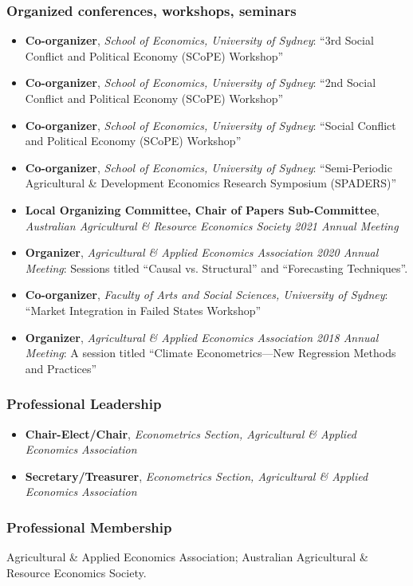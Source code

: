 \documentclass[10pt]{article}
\begin{document}
	\subsubsection*{Organized conferences, workshops, seminars}
	\begin{itemize}
		\item {} \textbf{Co-organizer}, \textsl{School of Economics, University of Sydney}: ``3rd Social Conflict and Political Economy (SCoPE) Workshop''
		\item {} \textbf{Co-organizer}, \textsl{School of Economics, University of Sydney}: ``2nd Social Conflict and Political Economy (SCoPE) Workshop''
		\item {} \textbf{Co-organizer}, \textsl{School of Economics, University of Sydney}: ``Social Conflict and Political Economy (SCoPE) Workshop''
		\item {} \textbf{Co-organizer}, \textsl{School of Economics, University of Sydney}: ``Semi-Periodic Agricultural \& Development Economics Research Symposium (SPADERS)''
		\item {} \textbf{Local Organizing Committee, Chair of Papers Sub-Committee}, \textsl{Australian Agricultural \& Resource Economics Society 2021 Annual Meeting}
		\item {} \textbf{Organizer}, \textsl{Agricultural \& Applied Economics Association 2020 Annual Meeting}: Sessions titled ``Causal vs. Structural'' and ``Forecasting Techniques''.
		\item {} \textbf{Co-organizer}, \textsl{Faculty of Arts and Social Sciences, University of Sydney}: ``Market Integration in Failed States Workshop''
		\item {} \textbf{Organizer}, \textsl{Agricultural \& Applied Economics Association 2018 Annual Meeting}: A session titled ``Climate Econometrics---New Regression Methods and Practices''
	\end{itemize}
	
	\bigskip
	\subsubsection*{Professional Leadership}
	\begin{itemize}
		\item {} \textbf{Chair-Elect/Chair}, \textsl{Econometrics Section, Agricultural \& Applied Economics Association}
		\item {} \textbf{Secretary/Treasurer}, \textsl{Econometrics Section, Agricultural \& Applied Economics Association}
	\end{itemize}
	
	\bigskip
	\subsubsection*{Professional Membership}
	Agricultural \& Applied Economics Association; 
	Australian Agricultural \& Resource Economics Society.

	
\end{document}
